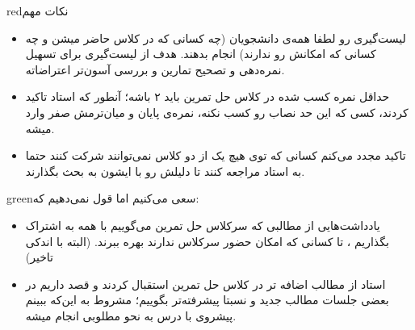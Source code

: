 \documentclass[a4paper, 12pt]{article}
\begin{document}
\vspace{2em}
\begin{boxes}{red}{نکات مهم}
	
	\begin{itemize}
		
		\item لیست‌گیری رو لطفا همه‌ی دانشجویان (چه کسانی که در کلاس حاضر میشن و چه کسانی که امکانش رو ندارند) انجام بدهند. هدف از لیست‌گیری برای تسهیل نمره‌دهی و تصحیح تمارین و بررسی آسون‌تر اعتراضاته.
		
		\item 
		حداقل نمره کسب شده در کلاس حل تمرین باید ۲ باشه؛ آنطور که استاد تاکید کردند، کسی که این حد نصاب رو کسب نکنه، نمره‌ی پایان و میان‌ترمش صفر وارد میشه.
		\item تاکید مجدد می‌کنم کسانی که توی هیچ یک از دو کلاس نمی‌توانند شرکت کنند حتما به استاد مراجعه کنند تا دلیلش رو با ایشون به بحث بگذارند.
	\end{itemize}
\end{boxes} 

\begin{boxes}{green}{سعی می‌کنیم اما قول نمی‌دهیم که:}
	
	\begin{itemize}
		
		\item یادداشت‌هایی از مطالبی که سرکلاس حل تمرین می‌گوییم با همه به اشتراک بگذاریم
 ، تا کسانی که امکان حضور سرکلاس ندارند بهره ببرند. (البته با اندکی تاخیر)		
		\item استاد از مطالب اضافه تر در کلاس حل تمرین استقبال کردند و قصد داریم در بعضی جلسات مطالب جدید و نسبتا پیشرفته‌تر بگوییم؛ مشروط به این‌که ببینم پیشروی با درس به نحو مطلوبی انجام میشه.
	\end{itemize}
\end{boxes} 
\end{document}
